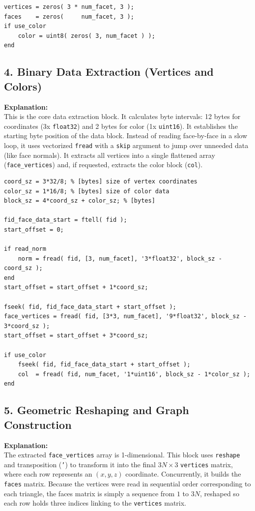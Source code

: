 \begin{lstlisting}
vertices = zeros( 3 * num_facet, 3 );
faces    = zeros(     num_facet, 3 );
if use_color
    color = uint8( zeros( 3, num_facet ) );
end
\end{lstlisting}


\subsection{4. Binary Data Extraction (Vertices and Colors)}
\textbf{Explanation:} \\
This is the core data extraction block. It calculates byte intervals: 12 bytes for coordinates (3x \texttt{float32}) and 2 bytes for color (1x \texttt{uint16}). It establishes the starting byte position of the data block. Instead of reading face-by-face in a slow loop, it uses vectorized \texttt{fread} with a \texttt{skip} argument to jump over unneeded data (like face normals). It extracts all vertices into a single flattened array (\texttt{face\_vertices}) and, if requested, extracts the color block (\texttt{col}).

\begin{lstlisting}
coord_sz = 3*32/8; % [bytes] size of vertex coordinates
color_sz = 1*16/8; % [bytes] size of color data
block_sz = 4*coord_sz + color_sz; % [bytes] 

fid_face_data_start = ftell( fid );
start_offset = 0;

if read_norm
	norm = fread( fid, [3, num_facet], '3*float32', block_sz - coord_sz );
end
start_offset = start_offset + 1*coord_sz;

fseek( fid, fid_face_data_start + start_offset );
face_vertices = fread( fid, [3*3, num_facet], '9*float32', block_sz - 3*coord_sz );
start_offset = start_offset + 3*coord_sz;

if use_color
	fseek( fid, fid_face_data_start + start_offset );
	col  = fread( fid, num_facet, '1*uint16', block_sz - 1*color_sz );
end
\end{lstlisting}


\subsection{5. Geometric Reshaping and Graph Construction}
\textbf{Explanation:} \\
The extracted \texttt{face\_vertices} array is 1-dimensional. This block uses \texttt{reshape} and transposition (\texttt{'}) to transform it into the final $3N \times 3$ \texttt{vertices} matrix, where each row represents an $(x, y, z)$ coordinate. Concurrently, it builds the \texttt{faces} matrix. Because the vertices were read in sequential order corresponding to each triangle, the faces matrix is simply a sequence from $1$ to $3N$, reshaped so each row holds three indices linking to the \texttt{vertices} matrix.

